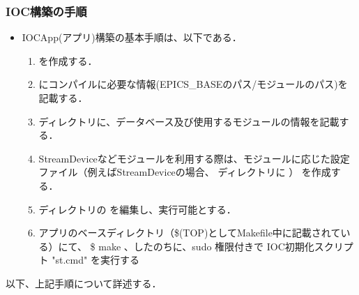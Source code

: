 \documentclass[letterpaper,10pt,dvipdfmx]{sphinxmanual}
\begin{document}
\subsubsection{IOC構築の手順}
\label{\detokenize{epics/rst/example1__httpRequest_to_Google:id3}}\begin{itemize}
\item {} 
IOC\sphinxhyphen{}App(アプリ)構築の基本手順は、以下である．
\begin{enumerate}
%
\item {} 
 を作成する．

\item {} 
 にコンパイルに必要な情報(EPICS\_BASEのパス/モジュールのパス)を記載する．

\item {} 
 ディレクトリに、データベース及び使用するモジュールの情報を記載する．

\item {} 
StreamDeviceなどモジュールを利用する際は、モジュールに応じた設定ファイル（例えばStreamDeviceの場合、  ディレクトリに  ） を作成する．

\item {} 
 ディレクトリの  を編集し、実行可能とする．

\item {} 
アプリのベースディレクトリ（\$(TOP)としてMakefile中に記載されている）にて、 \$ make 、したのちに、sudo 権限付きで IOC初期化スクリプト "st.cmd" を実行する

\end{enumerate}

\end{itemize}

以下、上記手順について詳述する．
\end{document}
